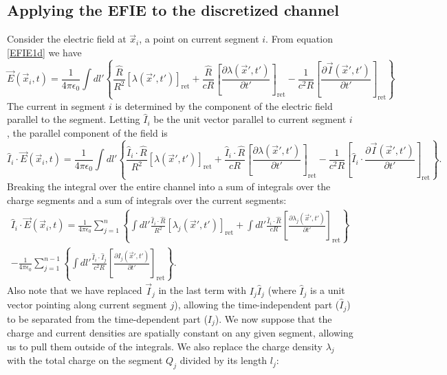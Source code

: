 \documentclass{article}
\begin{document}
\subsection{Applying the EFIE to the discretized channel}
Consider the electric field at $\vec{x}_i$, a point on current segment $i$. From equation \ref{EFIE1d} we have
\begin{equation}
\vec{E}(\vec{x}_i, t) = \frac{1}{4\pi\epsilon_0} \int dl' \left\{ \frac{\hat{R}}{R^2} \left[\lambda(\vec{x}', t')\right]_\text{ret} + \frac{\hat{R}}{cR} \left[\frac{\partial\lambda(\vec{x}', t')}{\partial t'}\right]_\text{ret} - \frac{1}{c^2R} \left[\frac{\partial\vec{I}(\vec{x}', t')}{\partial t'}\right]_\text{ret}\right\}
\end{equation}
The current in segment $i$ is determined by the component of the electric field parallel to the segment. Letting $\hat{I}_i$ be the unit vector parallel to current segment $i$, the parallel component of the field is
\begin{equation}
\hat{I}_i\cdot\vec{E}(\vec{x}_i, t) = \frac{1}{4\pi\epsilon_0} \int dl' \left\{ \frac{\hat{I}_i\cdot\hat{R}}{R^2} \left[\lambda(\vec{x}', t')\right]_\text{ret} + \frac{\hat{I}_i\cdot\hat{R}}{cR} \left[\frac{\partial\lambda(\vec{x}', t')}{\partial t'}\right]_\text{ret} - \frac{1}{c^2R} \left[\hat{I}_i\cdot\frac{\partial\vec{I}(\vec{x}', t')}{\partial t'}\right]_\text{ret}\right\}.
\end{equation}
Breaking the integral over the entire channel into a sum of integrals over the charge segments and a sum of integrals over the current segments:
\begin{equation}
\begin{split}
\hat{I}_i\cdot\vec{E}(\vec{x}_i, t) = \frac{1}{4\pi\epsilon_0} \sum_{j=1}^n \left\{\int dl' \frac{\hat{I}_i\cdot\hat{R}}{R^2} \left[\lambda_j(\vec{x}', t')\right]_\text{ret} + \int dl' \frac{\hat{I}_i\cdot\hat{R}}{cR} \left[\frac{\partial\lambda_j(\vec{x}', t')}{\partial t'}\right]_\text{ret}\right\}\\
- \frac{1}{4\pi\epsilon_0} \sum_{j=1}^{n-1} \left\{\int dl' \frac{\hat{I}_i\cdot\hat{I}_j}{c^2R} \left[\frac{\partial I_j(\vec{x}', t')}{\partial t'}\right]_\text{ret} \right\}.
\end{split}
\end{equation}
Also note that we have replaced $\vec{I}_j$ in the last term with $I_j\hat{I}_j$ (where $\hat{I}_j$ is a unit vector pointing along current segment $j$), allowing the time-independent part ($\hat{I}_j$) to be separated from the time-dependent part ($I_j$). We now suppose that the charge and current densities are spatially constant on any given segment, allowing us to pull them outside of the integrals. We also replace the charge density $\lambda_j$ with the total charge on the segment $Q_j$ divided by its length $l_j$:
\end{document}
